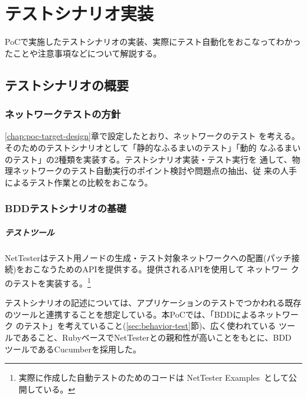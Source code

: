 

\chapter{テストシナリオ実装}
\label{chap:poc-scenario-dev}

PoCで実施したテストシナリオの実装、実際にテスト自動化をおこなってわかっ
たことや注意事項などについて解説する。

 \section{テストシナリオの概要}

  \subsection{ネットワークテストの方針}

\ref{chap:poc-target-design}章で設定したとおり、\yo ネットワークのテスト
を考える。そのためのテストシナリオとして「静的なふるまいのテスト」「動的
なふるまいのテスト」の2種類を実装する。テストシナリオ実装・テスト実行を
通して、物理ネットワークのテスト自動実行のポイント検討や問題点の抽出、従
来の人手によるテスト作業との比較をおこなう。

  \subsection{BDDテストシナリオの基礎}

      \paragraph{テストツール}
NetTesterはテスト用ノードの生成・テスト対象ネットワークへの配置(パッチ接
続)をおこなうためのAPIを提供する。提供されるAPIを使用して \yo ネットワー
クのテストを実装する。\footnote{実際に作成した自動テストのためのコードは
NetTester Examples~\cite{nettester-ex}として公開している。}

テストシナリオの記述については、アプリケーションのテストでつかわれる既存
のツールと連携することを想定している。本PoCでは、「BDDによるネットワーク
のテスト」を考えていること(\ref{sec:behavior-test}節)、広く使われている
ツールであること、RubyベースでNetTesterとの親和性が高いことをもとに、BDD
ツールであるCucumber\cite{cucumber}を採用した。

